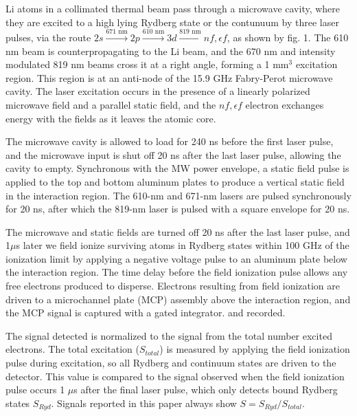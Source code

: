 \documentclass[aps,pra,preprint,groupedaddress]{revtex4-1}
\begin{document}
Li atoms in a collimated thermal beam pass through a microwave cavity, where they are excited to a high lying Rydberg state or the contunuum by three laser pulses, via the route $2s \xrightarrow{\text{671 nm}} 2p \xrightarrow{\text{610 nm}} 3d \xrightarrow{\text{819 nm}} nf, \epsilon f$, as shown by fig. 1. The 610 nm beam is counterpropagating to the Li beam, and the 670 nm and intensity modulated 819 nm beams cross it at a right angle, forming a 1 mm$^3$ excitation region. This region is at an anti-node of the 15.9 GHz Fabry-Perot microwave cavity. The laser excitation occurs in the presence of a linearly polarized microwave field and a parallel static field, and the $nf, \epsilon f$ electron exchanges energy with the fields as it leaves the atomic core.

The microwave cavity is allowed to load for 240 ns before the first laser pulse, and the microwave input is shut off 20 ns after the last laser pulse, allowing the cavity to empty. Synchronous with the MW power envelope, a static field pulse is applied to the top and bottom aluminum plates to produce a vertical static field in the interaction region. The 610-nm and 671-nm lasers are pulsed synchronously for 20 ns, after which the 819-nm laser is pulsed with a square envelope for 20 ns.


The microwave and static fields are turned off 20 ns after the last laser pulse, and 1$\mu$s later we field ionize surviving atoms in Rydberg states within 100 GHz of the ionization limit by applying a negative voltage pulse to an aluminum plate below the interaction region. The time delay before the field ionization pulse allows any free electrons produced to disperse. Electrons resulting from field ionization are driven to a microchannel plate (MCP) assembly above the interaction region, and the MCP signal is captured with a gated integrator. and recorded.

The signal detected is normalized to the signal from the total number excited electrons. The total excitation ($S_{total}$) is measured by applying the field ionization pulse during excitation, so all Rydberg and continuum states are driven to the detector. This value is compared to the signal observed when the field ionization pulse occurs 1 $\mu$s after the final laser pulse, which only detects bound Rydberg states $S_{Ryd}$. Signals reported in this paper always show $S = S_{Ryd} / S_{total}$.
\end{document}
